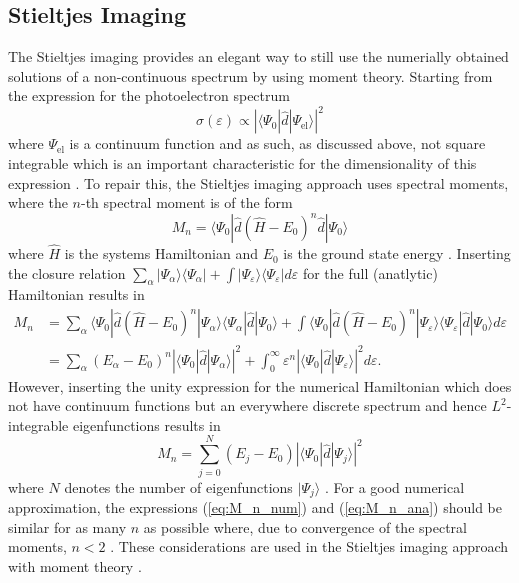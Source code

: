 \subsection{Stieltjes Imaging}
\label{ch:stieltjes}
The Stieltjes imaging provides an elegant way to still use the numerially obtained solutions of a non-continuous spectrum by using moment theory.
Starting from the expression for the photoelectron spectrum 
\begin{equation}
\sigma(\varepsilon)\propto \left|\langle \Psi_0 |\hat{d}|\Psi_\text{el} \rangle \right|^2
\end{equation}
where $\Psi_\text{el}$ is a continuum function and as such, as discussed above, not square integrable which is an important characteristic for the dimensionality of this expression \cite{stieltjesCeder}.
To repair this, the Stieltjes imaging approach uses spectral moments, where  the $n$-th spectral moment is of the form
\begin{equation}
   M_n=\langle \Psi_0 |\hat{d} (\hat{H}-E_0)^n \hat{d} | \Psi_0  \rangle
\end{equation}
where $\hat{H}$ is the systems Hamiltonian and $E_0$ is the ground state energy \cite{langhoff3}.
Inserting the closure relation $\sum_\alpha |\Psi_\alpha\rangle\langle \Psi_\alpha|+\int |\Psi_\varepsilon\rangle\langle \Psi_\varepsilon| d\varepsilon$ for the full (anatlytic) Hamiltonian results in
\begin{align}\label{eq:M_n_ana}
   M_n&=\sum_\alpha \langle \Psi_0 |\hat{d} (\hat{H}-E_0)^n|\Psi_\alpha\rangle\langle \Psi_\alpha| \hat{d} | \Psi_0  \rangle
      + \int  \langle \Psi_0|\hat{d} (\hat{H}-E_0)^n|\Psi_\varepsilon\rangle\langle \Psi_\varepsilon| \hat{d} | \Psi_0  \rangle d\varepsilon \\
      &= \sum_\alpha \left(E_\alpha-E_0\right)^n \left|\langle \Psi_0 | \hat{d}| \Psi_\alpha\rangle \right|^2 + 
         \int_{0}^\infty \varepsilon^n \left|\langle \Psi_0 | \hat{d}| \Psi_\varepsilon\rangle \right|^2 d \varepsilon.
\end{align}
However, inserting the unity expression for the numerical Hamiltonian which does not have continuum functions but an everywhere discrete spectrum and hence $L^2$-integrable eigenfunctions results in
\begin{equation} \label{eq:M_n_num}
      M_n= \sum_{j=0}^N (E_j-E_0) \left| \langle \Psi_0 | \hat{d}| \Psi_j\rangle \right|^2
\end{equation}
where $N$ denotes the number of eigenfunctions $|\Psi_j\rangle$ \cite{stieltjeLanczos,stieltjesCeder}.
For a good numerical approximation, the expressions (\ref{eq:M_n_num}) and (\ref{eq:M_n_ana}) should be similar for as many $n$ as possible where, due to convergence of the spectral moments, $n<2$ \cite{stieltjesCeder}.
These considerations are used in the Stieltjes imaging approach with moment theory \cite{langhoff, langhoff2}.


